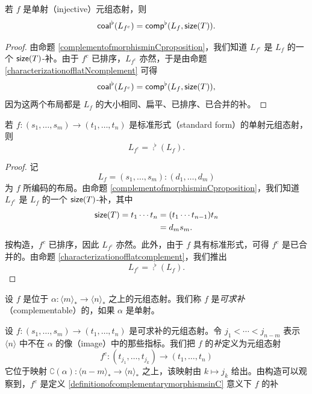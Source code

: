\begin{proposition}\label{coalescedlayoutoftuplemorphismcomplement}
    若 $f$ 是单射（injective）元组态射，则
    \[
    \mathsf{coal}^\flat(L_{f^c}) = \mathsf{comp}^\flat(L_f,\mathsf{size}(T)).
    \]
\end{proposition}

\begin{proof}
    由命题 \ref{complementofmorphisminCproposition}，我们知道 $L_{f^c}$ 是 $L_f$ 的一个 $\mathsf{size}(T)$-补。由于 $f^c$ 已排序，$L_{f^c}$ 亦然，于是由命题 \ref{characterizationofflatNcomplement} 可得
    \[
    \mathsf{coal}^\flat(L_{f^c}) = \mathsf{comp}^\flat(L_f,\mathsf{size}(T)),
    \]
    因为这两个布局都是 $L_f$ 的大小相同、扁平、已排序、已合并的补。 
\end{proof}

\begin{proposition}
    若 $f:(s_1,\dots,s_m) \to (t_1,\dots,t_n)$ 是标准形式（standard form）的单射元组态射，则
    \[
    L_{f^c} = \comp^\flat(L_f).
    \]
\end{proposition}

\begin{proof}
    记
    \[
    L_f = (s_1,\dots,s_m):(d_1,\dots,d_m)
    \]
    为 $f$ 所编码的布局。由命题 \ref{complementofmorphisminCproposition}，我们知道 $L_{f^c}$ 是 $L_f$ 的一个 $\mathsf{size}(T)$-补，其中
    \begin{align*}
    \mathsf{size}(T) = t_1 \cdots t_n & = (t_1 \cdots t_{n-1})t_n\\
    & = d_m s_m.
    \end{align*}
    按构造，$f^c$ 已排序，因此 $L_{f^c}$ 亦然。此外，由于 $f$ 具有标准形式，可得 $f^c$ 是已合并的。由命题 \ref{characterizationofflatcomplement}，我们推出
        \[
    L_{f^c} = \comp^\flat(L_f).
    \]
\end{proof}


\begin{definition}\label{definitionofcomplementabletuplemorphism}
    设 $f$ 是位于 $\alpha:\langle m \rangle_* \to \langle n \rangle_*$ 之上的元组态射。我们称 $f$ 是{\it 可求补}（complementable）的，如果 $\alpha$ 是单射。
\end{definition}

\begin{construction}\label{complementofmorphisminC}
    设 $f:(s_1,\dots,s_m) \to (t_1,\dots,t_n)$ 是可求补的元组态射。令 $j_1 < \cdots < j_{n-m}$ 表示 $\langle n \rangle$ 中不在 $\alpha$ 的像（image）中的那些指标。我们把 $f$ 的{\it 补}定义为元组态射
    \[
    f^c :(t_{j_1},\dots,t_{j_k}) \to (t_1,\dots,t_n)
    \]
    它位于映射 $\complement(\alpha): \langle n-m \rangle_* \to \langle n \rangle_*$ 之上，该映射由 $k \mapsto j_k$ 给出。由构造可以观察到，$f^c$ 是定义 \ref{definitionofcomplementarymorphismsinC} 意义下 $f$ 的补
\end{construction}


